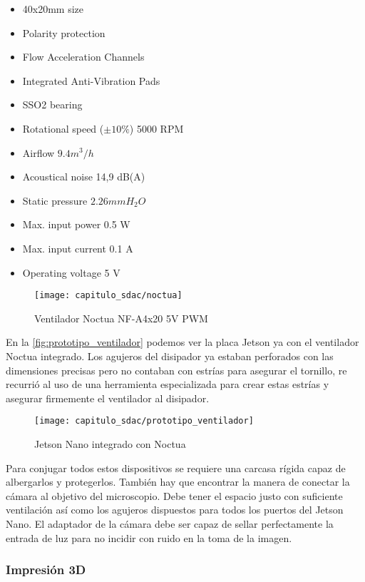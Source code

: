 \begin{itemize}
    \item 40x20mm size
    \item Polarity protection
    \item Flow Acceleration Channels
    \item Integrated Anti-Vibration Pads
    \item SSO2 bearing
    \item Rotational speed ($\pm 10\%$) 5000 RPM
    \item Airflow $9.4 m^{3}/h$
    \item Acoustical noise 14,9 dB(A)
    \item Static pressure $2.26 mm H_{2}O$
    \item Max. input power 0.5 W
    \item Max. input current 0.1 A    
    \item Operating voltage 5 V
\end{itemize}

\begin{figure}[H]
    \centering
    \texttt{[image: capitulo\_sdac/noctua]}
    \caption{Ventilador Noctua NF-A4x20 5V PWM}\label{fig:noctua}
\end{figure}

En la \autoref{fig:prototipo_ventilador} podemos ver la placa Jetson ya con el
ventilador Noctua integrado. Los agujeros del disipador ya estaban perforados
con las dimensiones precisas pero no contaban con estrías para asegurar el
tornillo, re recurrió al uso de una herramienta especializada para crear estas
estrías y asegurar firmemente el ventilador al disipador.

\begin{figure}[H]
    \centering
    \texttt{[image: capitulo\_sdac/prototipo\_ventilador]}
    \caption{Jetson Nano integrado con Noctua}\label{fig:prototipo_ventilador}
\end{figure}

Para conjugar todos estos dispositivos se requiere una carcasa rígida capaz de
albergarlos y protegerlos. También hay que encontrar la manera de conectar la
cámara al objetivo del microscopio. Debe tener el espacio justo con suficiente
ventilación así como los agujeros dispuestos para todos los puertos del Jetson
Nano. El adaptador de la cámara debe ser capaz de sellar perfectamente la
entrada de luz para no incidir con ruido en la toma de la imagen.

\subsubsection{Impresión 3D}

